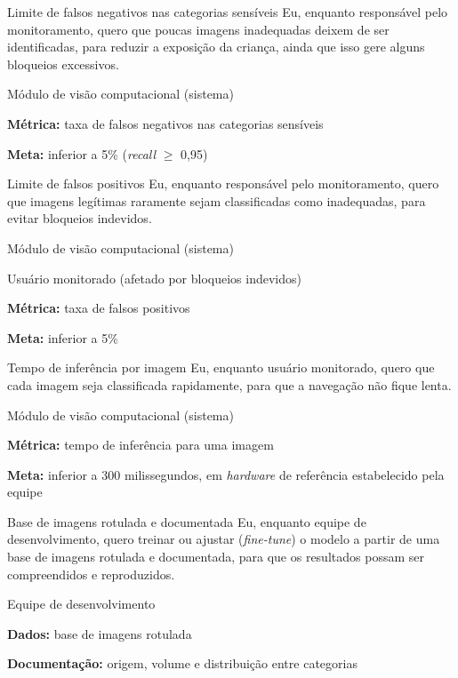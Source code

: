 \documentclass[
    12pt,           %
    oneside,        %
    a4paper,        %
    chapter=TITLE,  %
    english,        %
    brazil          %
]{abntex2}
\begin{document}
{Limite de falsos negativos nas categorias sensíveis}
{Eu, enquanto responsável pelo monitoramento, quero que poucas imagens inadequadas deixem de ser identificadas, para reduzir a exposição da criança, ainda que isso gere alguns bloqueios excessivos.}
{\begin{dadoslista}
\item Módulo de visão computacional (sistema)
\end{dadoslista}}
{\begin{dadoslista}
\item \textbf{Métrica:} taxa de falsos negativos nas categorias sensíveis
\item \textbf{Meta:} inferior a 5\% (\textit{recall} $\geq$ 0,95)
\end{dadoslista}}

{Limite de falsos positivos}
{Eu, enquanto responsável pelo monitoramento, quero que imagens legítimas raramente sejam classificadas como inadequadas, para evitar bloqueios indevidos.}
{\begin{dadoslista}
\item Módulo de visão computacional (sistema)
\item Usuário monitorado (afetado por bloqueios indevidos)
\end{dadoslista}}
{\begin{dadoslista}
\item \textbf{Métrica:} taxa de falsos positivos
\item \textbf{Meta:} inferior a 5\%
\end{dadoslista}}

{Tempo de inferência por imagem}
{Eu, enquanto usuário monitorado, quero que cada imagem seja classificada rapidamente, para que a navegação não fique lenta.}
{\begin{dadoslista}
\item Módulo de visão computacional (sistema)
\end{dadoslista}}
{\begin{dadoslista}
\item \textbf{Métrica:} tempo de inferência para uma imagem
\item \textbf{Meta:} inferior a 300 milissegundos, em \textit{hardware} de referência estabelecido pela equipe
\end{dadoslista}}

{Base de imagens rotulada e documentada}
{Eu, enquanto equipe de desenvolvimento, quero treinar ou ajustar (\textit{fine-tune}) o modelo a partir de uma base de imagens rotulada e documentada, para que os resultados possam ser compreendidos e reproduzidos.}
{\begin{dadoslista}
\item Equipe de desenvolvimento
\end{dadoslista}}
{\begin{dadoslista}
\item \textbf{Dados:} base de imagens rotulada
\item \textbf{Documentação:} origem, volume e distribuição entre categorias
\end{dadoslista}}
\end{document}
